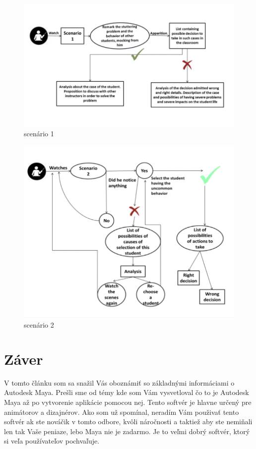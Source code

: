 \documentclass[10pt,oneside,slovak,a4paper]{article}
\begin{document}
\begin{figure}[h]
\centering
\includegraphics[scale=0.37]{scenario 1.png}
\caption{scenário 1\cite{studies}}
\label{f:scenario1}
\end{figure}
\begin{figure}[h]
\centering
\includegraphics[scale=0.37]{scenario 2.png}
\caption{scenário 2\cite{studies}}
\label{f:scenario2}
\end{figure}





\section{Záver} \label{zaver}

V tomto článku som sa snažil Vás oboznámiť so základnými informáciami o Autodesk Maya. Prešli sme od témy kde som Vám vysvetloval čo to je Autodesk Maya až po vytvorenie aplikácie pomocou nej. Tento softvér je hlavne určený pre animátorov a dizajnérov. Ako som už spomínal, neradím Vám použivať tento softvér ak ste nováčik v tomto odbore, kvôli náročnosti a taktiež aby ste nemiňali len tak Vaše peniaze, lebo Maya nie je zadarmo. Je to veľmi dobrý softvér, ktorý si veľa používateľov pochvaľuje. 


 
\end{document}
